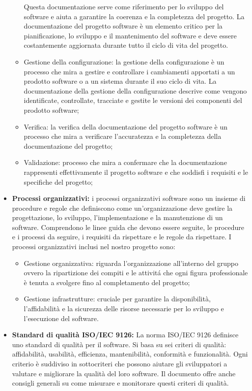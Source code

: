 \begin{itemize}
\begin{itemize}
    Questa documentazione serve come riferimento per lo sviluppo del software e aiuta a garantire la coerenza e la completezza del progetto. 
    La documentazione del progetto software è un elemento critico per la pianificazione, lo sviluppo e il mantenimento del software e deve essere costantemente aggiornata durante tutto il ciclo di vita del progetto.
    \item Gestione della configurazione: la gestione della configurazione è un processo che mira a gestire e controllare i cambiamenti apportati a un prodotto software o a un sistema durante il suo ciclo di vita. 
    La documentazione della gestione della configurazione descrive come vengono identificate, controllate, tracciate e gestite le versioni dei componenti del prodotto software;
    \item Verifica: la verifica della documentazione del progetto software è un processo che mira a verificare l'accuratezza e la completezza della documentazione del progetto;
    \item Validazione: processo che mira a confermare che la documentazione rappresenti effettivamente il progetto software e che soddisfi i requisiti e le specifiche del progetto;
\end{itemize}
\item \textbf{Processi organizzativi:} i processi organizzativi software sono un insieme di procedure e regole che definiscono come un'organizzazione deve gestire la progettazione, lo sviluppo, l'implementazione e la manutenzione di un software.
Comprendono le linee guida che devono essere seguite, le procedure e i processi da seguire, i requisiti da rispettare e le regole da rispettare.
I processi organizzativi inclusi nel nostro progetto sono:
\begin{itemize}
    \item Gestione organizzativa: riguarda l'organizzazione all'interno del gruppo ovvero la ripartizione dei compiti e le attivitá che ogni figura professionale è tenuta a svolgere fino al 
    completamento del progetto;
    \item Gestione infrastrutture: cruciale per garantire la disponibilità, l'affidabilità e la sicurezza delle risorse necessarie per lo sviluppo e l'esecuzione del software.
\end{itemize}
\item \textbf{Standard di qualità ISO/IEC 9126:} La norma ISO/IEC 9126 definisce uno standard di qualità per il software. 
Si basa su sei criteri di qualità: affidabilità, usabilità, efficienza, mantenibilità, conformità e funzionalità. 
Ogni criterio è suddiviso in sottocriteri che possono aiutare gli sviluppatori a valutare e migliorare la qualità del loro software. 
Il documento offre anche consigli generali su come misurare e monitorare questi criteri di qualità.


\end{itemize}
